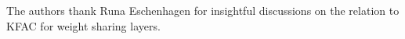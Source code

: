\begin{ack} %
  The authors thank Runa Eschenhagen for insightful discussions on the relation to KFAC for weight sharing layers.
\end{ack}
